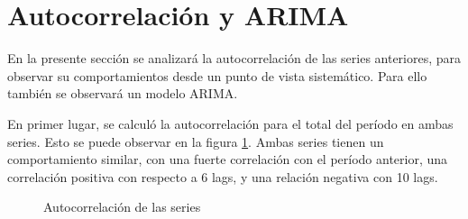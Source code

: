 \documentclass[a4paper]{article}
\begin{document}
\section{Autocorrelación y ARIMA}

En la presente sección se analizará la autocorrelación de las series anteriores, para observar su comportamientos desde un punto de vista sistemático. Para ello también se observará un modelo ARIMA. 

En primer lugar, se calculó la autocorrelación para el total del período en ambas series. Esto se puede observar en la figura \ref{fig:autocorrelacion_tot}. Ambas series tienen un comportamiento similar, con una fuerte correlación con el período anterior, una correlación positiva con respecto a 6 lags, y una relación negativa con 10 lags. 

\begin{figure}[H]
	\centering
	\caption{Autocorrelación de las series} \label{fig:autocorrelacion_tot}
\end{figure}
\end{document}
